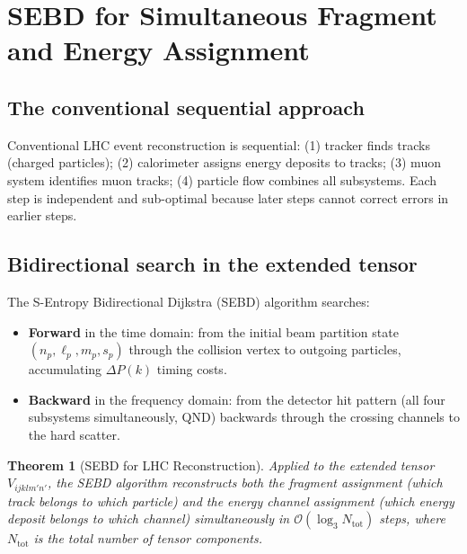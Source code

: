 \documentclass[twocolumn,10pt,a4paper]{article}
\theoremstyle{thmstyle}
\newtheorem{theorem}{Theorem}[section]
\theoremstyle{definition}
\theoremstyle{remark}
\begin{document}
\section{SEBD for Simultaneous Fragment and Energy Assignment}
\label{sec:sebd}

\subsection{The conventional sequential approach}

Conventional LHC event reconstruction is sequential:
(1) tracker finds tracks (charged particles);
(2) calorimeter assigns energy deposits to tracks;
(3) muon system identifies muon tracks;
(4) particle flow combines all subsystems.
Each step is independent and sub-optimal because later steps cannot
correct errors in earlier steps.

\subsection{Bidirectional search in the extended tensor}

The S-Entropy Bidirectional Dijkstra (SEBD) algorithm
\citep{companion:sebd} searches:
\begin{itemize}[nosep]
\item \textbf{Forward} in the time domain: from the initial beam partition
  state $(n_p, \ell_p, m_p, s_p)$ through the collision vertex to outgoing
  particles, accumulating $\Delta P(k)$ timing costs.
\item \textbf{Backward} in the frequency domain: from the detector hit
  pattern (all four subsystems simultaneously, QND) backwards through the
  crossing channels to the hard scatter.
\end{itemize}

\begin{theorem}[SEBD for LHC Reconstruction]
\label{thm:sebd_lhc}
Applied to the extended tensor $V_{ijklm'n'}$, the SEBD algorithm
reconstructs both the fragment assignment (which track belongs to which
particle) and the energy channel assignment (which energy deposit belongs
to which channel) simultaneously in $\mathcal{O}(\log_3 N_\text{tot})$
steps, where $N_\text{tot}$ is the total number of tensor components.
\end{theorem}
\end{document}

